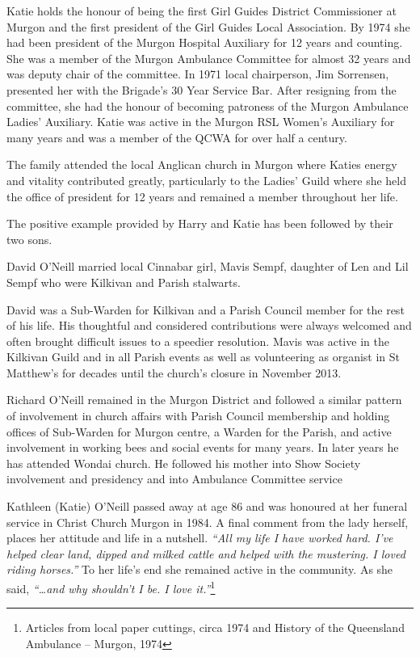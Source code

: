 Katie holds the honour of being the first Girl Guides District Commissioner at Murgon and the first president of the Girl Guides Local Association. By 1974 she had been president of the Murgon Hospital Auxiliary for 12 years and counting. She was a member of the Murgon Ambulance Committee for almost 32 years and was deputy chair of the committee. In 1971 local chairperson, Jim Sorrensen, presented her with the Brigade's 30 Year Service Bar. After resigning from the committee, she had the honour of becoming patroness of the Murgon Ambulance Ladies' Auxiliary. Katie was active in the Murgon RSL Women's Auxiliary for many years and was a member of the QCWA for over half a century.



The family attended the local Anglican church in Murgon where Katies energy and vitality contributed greatly, particularly to the Ladies' Guild where she held the office of president for 12 years and remained a member throughout her life.



The positive example provided by Harry and Katie has been followed by their two sons.



David O'Neill married local Cinnabar girl, Mavis Sempf, daughter of Len and Lil Sempf who were Kilkivan and Parish stalwarts.



David was a Sub-Warden for Kilkivan and a Parish Council member for the rest of his life. His thoughtful and considered contributions were always welcomed and often brought difficult issues to a speedier resolution. Mavis was active in the Kilkivan Guild and in all Parish events as well as volunteering as organist in St Matthew's for decades until the church's closure in November 2013.



Richard O'Neill remained in the Murgon District and followed a similar pattern of involvement in church affairs with Parish Council membership and holding offices of Sub-Warden for Murgon centre, a Warden for the Parish, and active involvement in working bees and social events for many years. In later years he has attended Wondai church. He followed his mother into Show Society involvement and presidency and into Ambulance Committee service



Kathleen (Katie) O'Neill passed away at age 86 and was honoured at her funeral service in Christ Church Murgon in 1984. A final comment from the lady herself, places her attitude and life in a nutshell. \emph{``All my life I have worked hard. I've helped clear land, dipped and milked cattle and helped with the mustering. I loved riding horses.''} To her life's end she remained active in the community. As she said, \emph{``\ldots and why shouldn't I be. I love it.''}\footnote{Articles from local paper cuttings, circa 1974 and History of the Queensland Ambulance -- Murgon, 1974}


